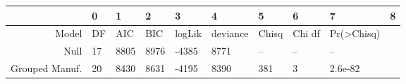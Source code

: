 \begin{tabular}{rllllllll}
\toprule
{} &               0 &   1 &     2 &     3 &       4 &         5 &      6 &       7 &           8 \\
\midrule
          Model &  DF &   AIC &   BIC &  logLik &  deviance &  Chisq &  Chi df &  Pr(>Chisq) \\
           Null &  17 &  8805 &  8976 &   -4385 &      8771 &     -- &      -- &          -- \\
  Grouped Manuf. &  20 &  8430 &  8631 &   -4195 &      8390 &    381 &       3 &     2.6e-82 \\
\bottomrule
\end{tabular}
